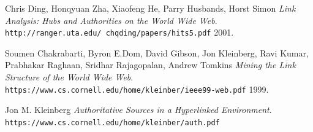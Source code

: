 \documentclass[11pt]{article}
\begin{document}
\newpage
\begin{thebibliography}{9}
Chris Ding, Honqyuan Zha, Xiaofeng He, Parry Husbands, Horst Simon
\textit{Link Analysis: Hubs and Authorities on the World Wide Web}. 
\\\texttt{http://ranger.uta.edu/~chqding/papers/hits5.pdf}
2001.

Soumen Chakrabarti, Byron E.Dom, David Gibson, Jon Kleinberg, Ravi Kumar, Prabhakar Raghaan, Sridhar Rajagopalan, Andrew Tomkins
\textit{Mining the Link Structure of the World Wide Web}. 
\\\texttt{https://www.cs.cornell.edu/home/kleinber/ieee99-web.pdf}
1999.

Jon M. Kleinberg
\textit{Authoritative Sources in a Hyperlinked Environment}. 
\\\texttt{https://www.cs.cornell.edu/home/kleinber/auth.pdf}

\end{thebibliography}
\end{document}
